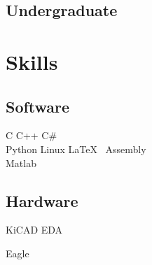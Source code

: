 \documentclass[]{deedy-resume-openfont}
\begin{document}
\begin{minipage}[t]{0.33\textwidth}
\subsection{Undergraduate}

\sectionsep


\section{Skills}
\subsection{Software}
C \textbullet{}  C++ \textbullet{} C\# \textbullet{}  \\ 

Python \textbullet{} Linux \textbullet{} \LaTeX\ \textbullet{} Assembly \\
Matlab
\subsection{Hardware}
KiCAD EDA

Eagle

\sectionsep

%
%

\end{minipage} 
\hfill
\end{document}
